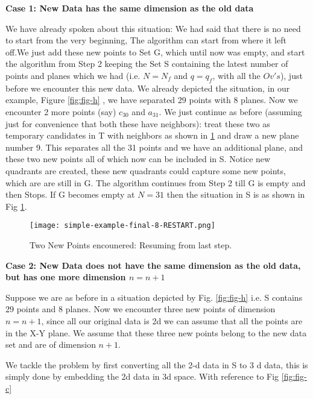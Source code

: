 \documentclass[english]{article}
\begin{document}
\textbf{Case 1: New Data has the same dimension as the old data} 

We have already spoken about this situation: We had said that there is no need to start from the very beginning, The algorithm can start from where it left off.We just add these new points to Set G, which until now was empty, and start the algorithm from Step 2 keeping the Set S containing the latest number of points and planes which we had (i.e. $N=N_f$ and $q=q_f$, with all the $Ov's$), just before we encounter this new data. We already depicted the situation, in our example, Figure \ref{fig:fig-h} , we have separated 29 points with 8 planes. Now we encounter 2 more points (say) $c_{30}$ and $a_{31}$. We just continue as before (assuming just for convenience that both these have neighbors): treat these two as temporary candidates in T with neighbors as shown in \ref{fig:fig-j} and draw a new plane number 9. This separates all the 31 points and  we have an additional plane, and these two new points all of which now can be included in S. Notice new quadrants are created, these new quadrants could capture some new points,  which are are still in G. The algorithm continues from Step 2 till G is empty and then Stops. If G becomes empty at $N=31$ then the situation in S is as shown in Fig \ref{fig:fig-j}.



\medskip{}
\medskip{}
\begin{figure}[htp]
 \begin{center}
\texttt{[image: simple-example-final-8-RESTART.png]}

\caption{Two New Points encounered: Resuming from last step.}

\label{fig:fig-j} \end{center}
\end{figure} 

\medskip{}

\textbf{Case 2: New Data does not have the same dimension as the old data, but has one more dimension $n=n+1$} 

Suppose we are as before in a situation depicted by Fig. \ref{fig:fig-h} i.e. S contains 29 points and 8 planes. Now we encounter three new points of dimension $n=n+1$, since all  our original data is 2d we can assume that all the points are in the X-Y plane. We assume that these three new points belong to the new data set and are of dimension $n+1$. 

We tackle the problem by first converting all the 2-d data in S to 3 d data, this is simply done by embedding the 2d data in 3d space. With reference to Fig \ref{fig:fig-c}
\end{document}

